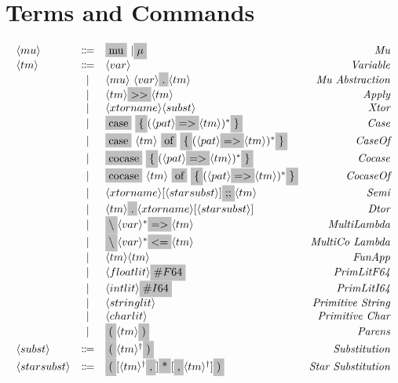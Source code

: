 \section{Terms and Commands}
\[
  \begin{array}{lclr}
    \nonterminal{mu} & \Coloneqq & \terminal{mu}\ | \terminal{$\mu$} & \emph{Mu} \\
    \nonterminal{tm} & \Coloneqq & \nonterminal{var} & \emph{Variable} \\
    & | & \nonterminal{mu}\ \nonterminal{var} \terminal{.} \nonterminal{tm} & \textit{Mu Abstraction} \\
    & | & \nonterminal{tm} \terminal{$>>$} \nonterminal{tm} & \textit{Apply} \\
    & | & \nonterminal{xtorname}\nonterminal{subst} & \emph{Xtor} \\
    & | & \terminal{case}\ \terminal{\{} (\nonterminal{pat} \terminal{$=>$} \nonterminal{tm})^{\ast} \terminal{\}} & \emph{Case} \\
    & | & \terminal{case}\ \nonterminal{tm}\ \terminal{of}\ \terminal{\{} (\nonterminal{pat} \terminal{$=>$} \nonterminal{tm})^{\ast} \terminal{\}} & \emph{CaseOf} \\
    & | & \terminal{cocase}\ \terminal{\{} (\nonterminal{pat} \terminal{$=>$} \nonterminal{tm})^{\ast} \terminal{\}} & \emph{Cocase} \\
    & | & \terminal{cocase}\ \nonterminal{tm}\ \terminal{of}\ \terminal{\{} (\nonterminal{pat} \terminal{$=>$} \nonterminal{tm})^{\ast} \terminal{\}} & \emph{CocaseOf} \\
    & | & \nonterminal{xtorname}[\nonterminal{starsubst}]\terminal{;;}\nonterminal{tm} & \emph{Semi} \\
    & | & \nonterminal{tm}\terminal{.}\nonterminal{xtorname}[\nonterminal{starsubst}] & \emph{Dtor} \\
    & | & \terminal{$\backslash$} \nonterminal{var}^{\ast}\terminal{$=>$} \nonterminal{tm} & \emph{MultiLambda} \\
    & | & \terminal{$\backslash$} \nonterminal{var}^{\ast}\terminal{$<=$} \nonterminal{tm} & \emph{MultiCo  Lambda} \\
    & | & \nonterminal{tm} \nonterminal{tm} & \emph{FunApp} \\
    & | & \nonterminal{floatlit}\terminal{$\#F64$} & \emph{PrimLitF64} \\
    & | & \nonterminal{intlit}\terminal{$\#I64$} & \emph{PrimLitI64} \\
    & | & \nonterminal{stringlit} & \emph{Primitive String} \\
    & | & \nonterminal{charlit} & \emph{Primitive Char} \\
    & | & \terminal{(} \nonterminal{tm} \terminal{)} & \emph{Parens} \\
    \nonterminal{subst} & \Coloneqq & \terminal{(} \commalist{\nonterminal{tm}} \terminal{)} & \emph{Substitution} \\
    \nonterminal{starsubst} & \Coloneqq & \terminal{(} \commalist{[\nonterminal{tm}}\terminal{,}] \terminal{*} [\terminal{,}\commalist{\nonterminal{tm}}] \terminal{)} & \emph{Star Substitution} \\ 
  \end{array}
\]

